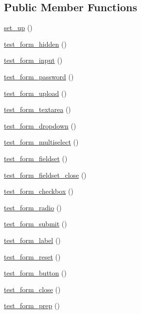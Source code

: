 \subsection*{Public Member Functions}
\begin{DoxyCompactItemize}
\item 
\hyperlink{class_form__helper__test_a69829875c8d4b6ce94908445c4155741}{set\+\_\+up} ()
\item 
\hyperlink{class_form__helper__test_aae5182dad72eb9b2726112fbab493726}{test\+\_\+form\+\_\+hidden} ()
\item 
\hyperlink{class_form__helper__test_a38f7dd1764e862b96a31827a85896ae3}{test\+\_\+form\+\_\+input} ()
\item 
\hyperlink{class_form__helper__test_ab93b6ac0014604fd464386a2959b4b06}{test\+\_\+form\+\_\+password} ()
\item 
\hyperlink{class_form__helper__test_a66d1b172b1bfa0e443be00bd8d71c010}{test\+\_\+form\+\_\+upload} ()
\item 
\hyperlink{class_form__helper__test_a18d876677314900dcfbb38669059011c}{test\+\_\+form\+\_\+textarea} ()
\item 
\hyperlink{class_form__helper__test_a9572d64e0ee671f71a952d48f6022cf4}{test\+\_\+form\+\_\+dropdown} ()
\item 
\hyperlink{class_form__helper__test_a39b0a47c36b9b275adc8c4ef5100dd01}{test\+\_\+form\+\_\+multiselect} ()
\item 
\hyperlink{class_form__helper__test_a022a88b367ae47f8484dabbf731cb0f0}{test\+\_\+form\+\_\+fieldset} ()
\item 
\hyperlink{class_form__helper__test_a4d38655396b18e60bbc11546e8881b9c}{test\+\_\+form\+\_\+fieldset\+\_\+close} ()
\item 
\hyperlink{class_form__helper__test_a618e20636cb4a34b5108589c968ace70}{test\+\_\+form\+\_\+checkbox} ()
\item 
\hyperlink{class_form__helper__test_aca17d4bffd6097f46476e9c61cc47f22}{test\+\_\+form\+\_\+radio} ()
\item 
\hyperlink{class_form__helper__test_a05cf2726fb75e3f618915a5f27e19bfa}{test\+\_\+form\+\_\+submit} ()
\item 
\hyperlink{class_form__helper__test_aa289706eddeb4a1c36667c927329b506}{test\+\_\+form\+\_\+label} ()
\item 
\hyperlink{class_form__helper__test_a420ecae6c9169583a1c23a000478c10c}{test\+\_\+form\+\_\+reset} ()
\item 
\hyperlink{class_form__helper__test_aad69098d730617f2af0ba49307dbd90a}{test\+\_\+form\+\_\+button} ()
\item 
\hyperlink{class_form__helper__test_aa9644354be0c83fae5b82f1ab9c4ed56}{test\+\_\+form\+\_\+close} ()
\item 
\hyperlink{class_form__helper__test_a552dad5c9cad811e3ec8fc556dc090c0}{test\+\_\+form\+\_\+prep} ()
\end{DoxyCompactItemize}
